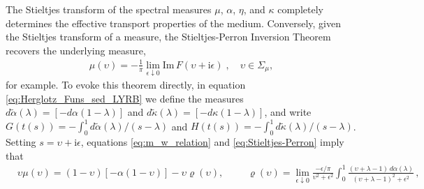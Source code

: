 \documentclass[english,12pt,jmp,graphicx]{revtex4-1}
\newcommand{\I}{\mathrm{i}}
\begin{document}
The Stieltjes transform of the spectral measures $\mu$, $\alpha$, $\eta$, and $\kappa$
completely determines the effective transport properties of the
medium. Conversely, given the Stieltjes transform of a measure, the
Stieltjes-Perron Inversion Theorem \cite{Henrici:1974:v3} recovers the
underlying measure, 
%
\begin{align}\label{eq:Stieltjes-Perron}
  \mu(\upsilon)=-\frac{1}{\pi}\lim_{\epsilon\downarrow0}\text{Im}\,F(\upsilon+\I\epsilon)\;, \quad
  \upsilon\in\Sigma_\mu, 
\end{align}
%
for example. To evoke this theorem directly, in equation
\eqref{eq:Herglotz_Funs_sed_LYRB} we define the measures
$d\tilde{\alpha}(\lambda)=[-d\alpha(1-\lambda)]$ and $d\tilde{\kappa}(\lambda)=[-d\kappa(1-\lambda)]$, and write
$G(t(s))=-\int_0^1d\tilde{\alpha}(\lambda)/(s-\lambda)$ and
$H(t(s))=-\int_0^1d\tilde{\kappa}(\lambda)/(s-\lambda)$. Setting $s=\upsilon+\I\epsilon$,
equations \eqref{eq:m_w_relation} and \eqref{eq:Stieltjes-Perron}
imply that  
%
\begin{align}\label{eq:BM_measure_relationship}
  &\upsilon\mu(\upsilon)=(1-\upsilon)[-\alpha(1-\upsilon)] - \upsilon\varrho(\upsilon), &&
  &\varrho(\upsilon)=%
       \lim_{\epsilon\downarrow 0}\frac{-\epsilon/\pi}{\upsilon^2+\epsilon^2}
         \int_0^1\frac{(\upsilon+\lambda-1)\,d\alpha(\lambda)}{(\upsilon+\lambda-1)^2+\epsilon^2}\,,&&
\end{align}
\end{document}
